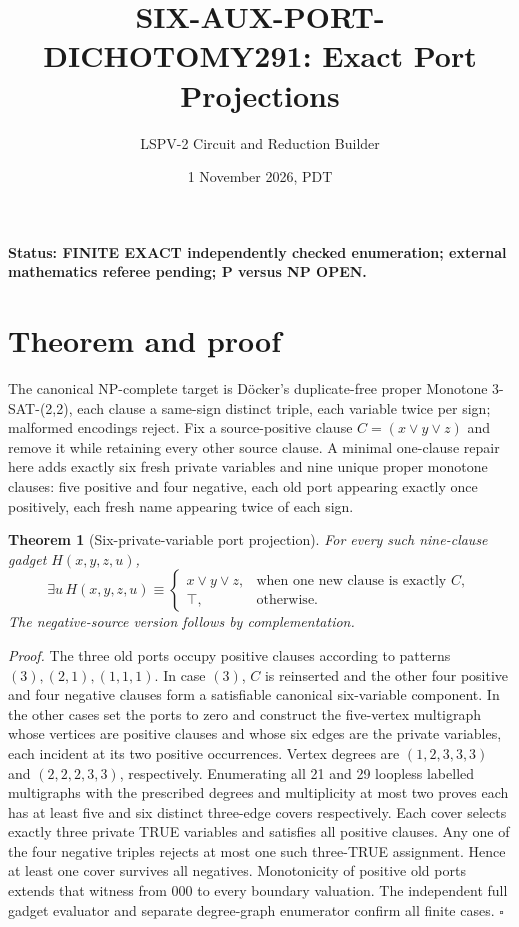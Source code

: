 \documentclass[11pt]{article}
\title{SIX-AUX-PORT-DICHOTOMY291: Exact Port Projections}
\author{LSPV-2 Circuit and Reduction Builder}
\date{1 November 2026, PDT}
\newtheorem{theorem}{Theorem}
\begin{document}
\maketitle
\noindent\textbf{Status: FINITE EXACT independently checked enumeration; external mathematics referee pending; P versus NP OPEN.}
\section{Theorem and proof}
The canonical NP-complete target is D\"ocker's duplicate-free proper Monotone 3-SAT-(2,2), each clause a same-sign distinct triple, each variable twice per sign; malformed encodings reject. Fix a source-positive clause $C=(x\vee y\vee z)$ and remove it while retaining every other source clause. A minimal one-clause repair here adds exactly six fresh private variables and nine unique proper monotone clauses: five positive and four negative, each old port appearing exactly once positively, each fresh name appearing twice of each sign.
\begin{theorem}[Six-private-variable port projection]
For every such nine-clause gadget $H(x,y,z,u)$,
\[
\exists u\,H(x,y,z,u)\equiv
\begin{cases}x\vee y\vee z,&\text{when one new clause is exactly }C,\\
\top,&\text{otherwise.}\end{cases}
\]
The negative-source version follows by complementation.
\end{theorem}
\noindent\textit{Proof.} The three old ports occupy positive clauses according to patterns $(3),(2,1),(1,1,1)$. In case $(3)$, $C$ is reinserted and the other four positive and four negative clauses form a satisfiable canonical six-variable component. In the other cases set the ports to zero and construct the five-vertex multigraph whose vertices are positive clauses and whose six edges are the private variables, each incident at its two positive occurrences. Vertex degrees are $(1,2,3,3,3)$ and $(2,2,2,3,3)$, respectively. Enumerating all 21 and 29 loopless labelled multigraphs with the prescribed degrees and multiplicity at most two proves each has at least five and six distinct three-edge covers respectively. Each cover selects exactly three private TRUE variables and satisfies all positive clauses. Any one of the four negative triples rejects at most one such three-TRUE assignment. Hence at least one cover survives all negatives. Monotonicity of positive old ports extends that witness from 000 to every boundary valuation. The independent full gadget evaluator and separate degree-graph enumerator confirm all finite cases. \hfill$\square$
\end{document}
